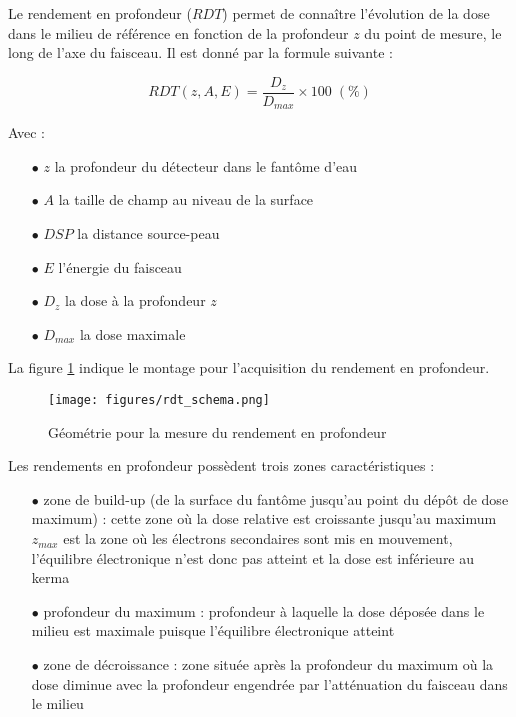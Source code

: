 \documentclass{book}
\begin{document}
Le rendement en profondeur ($RDT$) permet de connaître l'évolution de la dose dans le milieu de référence en fonction de la profondeur $z$ du point de mesure, le long de l'axe du faisceau. Il est donné par la formule suivante :

\begin{equation}
    RDT(z, A, E) = \dfrac{D_z}{D_{max}} \times 100 \; (\%)
    \label{eq_rdt}
\end{equation}

Avec :

\begin{itemize}
    \item[$\bullet$] $z$ la profondeur du détecteur dans le fantôme d'eau
    \item[$\bullet$] $A$ la taille de champ au niveau de la surface
    \item[$\bullet$] $DSP$ la distance source-peau
    \item[$\bullet$] $E$ l'énergie du faisceau
    \item[$\bullet$] $D_z$ la dose à la profondeur $z$
    \item[$\bullet$] $D_{max}$ la dose maximale
\end{itemize}

La figure \ref*{fig_rdt} indique le montage pour l'acquisition du rendement en profondeur.

\begin{figure}[h]
  \centering
  \texttt{[image: figures/rdt\_schema.png]}
  \caption{Géométrie pour la mesure du rendement en profondeur}
  \label{fig_rdt}
\end{figure}

Les rendements en profondeur possèdent trois zones caractéristiques :

\begin{itemize}
  \item[$\bullet$] zone de build-up (de la surface du fantôme jusqu'au point du dépôt de dose maximum) : cette zone où la dose relative est croissante jusqu'au maximum $z_{max}$ est la zone où les électrons secondaires sont mis en mouvement, l'équilibre électronique n'est donc pas atteint et la dose est inférieure au kerma
  \item[$\bullet$] profondeur du maximum : profondeur à laquelle la dose déposée dans le milieu est maximale puisque l'équilibre électronique atteint
  \item[$\bullet$] zone de décroissance : zone située après la profondeur du maximum où la dose diminue avec la profondeur engendrée par l'atténuation du faisceau dans le milieu
\end{itemize}
\end{document}
